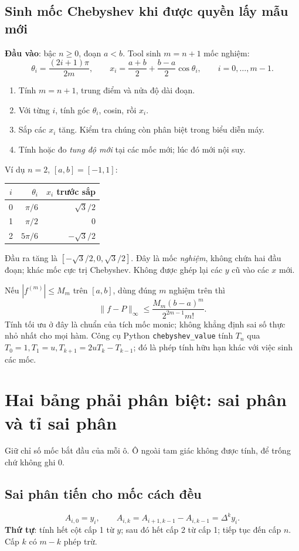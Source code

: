 \subsection{Sinh mốc Chebyshev khi được quyền lấy mẫu mới}
\label{sec:chebyshev}
\textbf{Đầu vào}: bậc $n\ge0$, đoạn $a<b$. Tool sinh $m=n+1$ mốc nghiệm:
\[
 \theta_i=\frac{(2i+1)\pi}{2m},\qquad
 x_i=\frac{a+b}{2}+\frac{b-a}{2}\cos\theta_i,
 \qquad i=0,\ldots,m-1.
\]
\begin{enumerate}
\item Tính $m=n+1$, trung điểm và nửa độ dài đoạn.
\item Với từng $i$, tính góc $\theta_i$, cosin, rồi $x_i$.
\item Sắp các $x_i$ tăng. Kiểm tra chúng còn phân biệt trong biểu diễn máy.
\item Tính hoặc đo \emph{tung độ mới} tại các mốc mới; lúc đó mới nội suy.
\end{enumerate}
Ví dụ $n=2$, $[a,b]=[-1,1]$:
\begin{center}\begin{tabular}{@{}crr@{}}\toprule
$i$ & $\theta_i$ & $x_i$ trước sắp\\\midrule
0 & $\pi/6$ & $\sqrt3/2$\\
1 & $\pi/2$ & $0$\\
2 & $5\pi/6$ & $-\sqrt3/2$\\\bottomrule
\end{tabular}\end{center}
Đầu ra tăng là $[-\sqrt3/2,0,\sqrt3/2]$. Đây là mốc \emph{nghiệm}, không chứa hai đầu đoạn; khác mốc cực trị Chebyshev. Không được ghép lại các $y$ cũ vào các $x$ mới.

Nếu $|f^{(m)}|\le M_m$ trên $[a,b]$, dùng đúng $m$ nghiệm trên thì
\[
 \|f-P\|_\infty\le
 \frac{M_m(b-a)^m}{2^{2m-1}m!}.
\]
Tính tối ưu ở đây là chuẩn của tích mốc monic; không khẳng định sai số thực nhỏ nhất cho mọi hàm. Công cụ Python \texttt{chebyshev\_value} tính $T_n$ qua $T_0=1,T_1=u,T_{k+1}=2uT_k-T_{k-1}$; đó là phép tính hữu hạn khác với việc sinh các mốc.

\section{Hai bảng phải phân biệt: sai phân và tỉ sai phân}
\label{sec:difference-tables}
Giữ chỉ số mốc bắt đầu của mỗi ô. Ô ngoài tam giác không được tính, để trống chứ không ghi 0.

\subsection{Sai phân tiến cho mốc cách đều}
\[
 A_{i,0}=y_i,\qquad
 A_{i,k}=A_{i+1,k-1}-A_{i,k-1}=\Delta^ky_i.
\]
\textbf{Thứ tự}: tính hết cột cấp 1 từ $y$; sau đó hết cấp 2 từ cấp 1; tiếp tục đến cấp $n$. Cấp $k$ có $m-k$ phép trừ.

